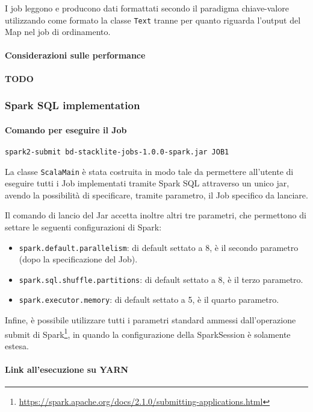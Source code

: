   I job leggono e producono dati formattati secondo il paradigma chiave-valore utilizzando come formato la classe \texttt{Text} tranne per quanto riguarda l'output del Map nel job di ordinamento.

  \paragraph{Considerazioni sulle performance}\label{par:job1:mapreduce:performance}

  \textbf{TODO}

  \subsubsection{Spark SQL implementation}\label{subsub:job1:spark}

  \paragraph{Comando per eseguire il Job}\label{par:job1:spark:cmd}

  \texttt{spark2-submit bd-stacklite-jobs-1.0.0-spark.jar JOB1}

  La classe \texttt{ScalaMain} è stata costruita in modo tale da permettere all'utente di eseguire tutti i Job implementati tramite
  Spark SQL attraverso un unico jar, avendo la possibilità di specificare, tramite parametro, il Job specifico da lanciare.

  Il comando di lancio del Jar accetta inoltre altri tre parametri, che permettono di settare le seguenti configurazioni di Spark\@:
  \begin{itemize}
    \item \texttt{spark.default.parallelism}: di default settato a 8, è il secondo parametro (dopo la specificazione del Job).
    \item \texttt{spark.sql.shuffle.partitions}: di default settato a 8, è il terzo parametro.
    \item \texttt{spark.executor.memory}: di default settato a 5, è il quarto parametro.
  \end{itemize}

  Infine, è possibile utilizzare tutti i parametri standard ammessi dall'operazione submit di Spark\footnote{\url{https://spark.apache.org/docs/2.1.0/submitting-applications.html}},
  in quando la configurazione della SparkSession è solamente estesa.

  \paragraph{Link all'esecuzione su YARN}\label{par:job1:spark:yarn}

